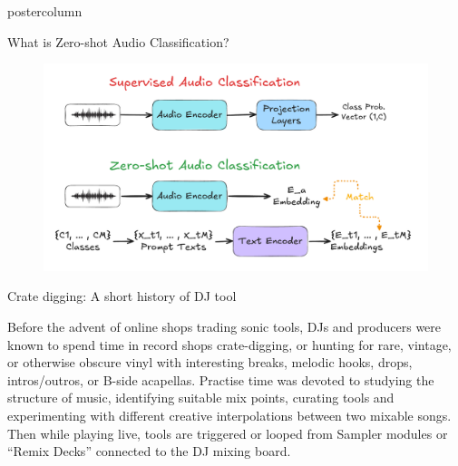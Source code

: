 \documentclass{beamer}
\begin{document}
\begin{frame}
\begin{columns}
\begin{column}{.57\textwidth}
\begin{beamercolorbox}[center]{postercolumn}
\begin{minipage}{.98\textwidth}
{\begin{myblock}{What is Zero-shot Audio Classification?}
						\vspace{0.2em}
						\begin{figure}
							\begin{minipage}{.94\textwidth}
								\centering\includegraphics[width=\textwidth]{img/CLAP-ISMIR_lbd.pdf}
								\caption{}
							\end{minipage}
						\end{figure}
						\vspace{0.4em}
						
						\vspace{0.1em}

						\vspace{1em}
						

					\end{myblock}\vfill
					
					
					\begin{myblock}{Crate digging: A short history of DJ tool}
					
					Before the advent of online shops trading sonic tools, DJs and producers were known to spend time in record shops crate-digging, or hunting for rare, vintage, or otherwise obscure vinyl with interesting breaks, melodic hooks, drops, intros/outros, or B-side acapellas. Practise time was devoted to studying the structure of music, identifying suitable mix points, curating tools and experimenting with different creative interpolations between two mixable songs. Then while playing live, tools are triggered or looped from Sampler modules or ``Remix Decks'' connected to the DJ mixing board.



					\end{myblock}\vfill
					
}
\end{minipage}
\end{beamercolorbox}
\end{column}
\end{columns}
\end{frame}
\end{document}
